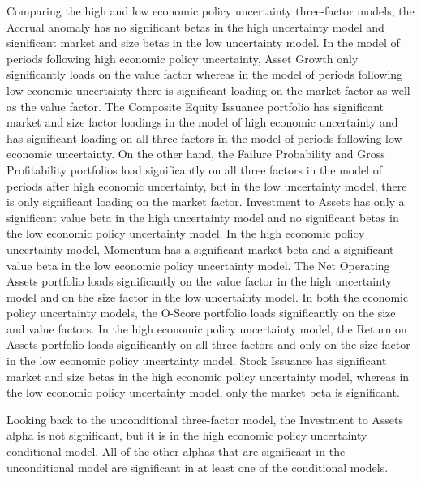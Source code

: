 \documentclass[12pt, a4paper, oneside]{article}
\begin{document}
Comparing the high and low economic policy uncertainty three-factor models, the Accrual anomaly has no significant betas in the high uncertainty model and significant market and size betas in the low uncertainty model. In the model of periods following high economic policy uncertainty, Asset Growth only significantly loads on the value factor whereas in the model of periods following low economic uncertainty there is significant loading on the market factor as well as the value factor. The Composite Equity Issuance portfolio has significant market and size factor loadings in the model of high economic uncertainty and has significant loading on all three factors in the model of periods following low economic uncertainty. On the other hand, the Failure Probability and Gross Profitability portfolios load significantly on all three factors in the model of periods after high economic uncertainty, but in the low uncertainty model, there is only significant loading on the market factor. Investment to Assets has only a significant value beta in the high uncertainty model and no significant betas in the low economic policy uncertainty model. In the high economic policy uncertainty model, Momentum has a significant market beta and a significant value beta in the low economic policy uncertainty model. The Net Operating Assets portfolio loads significantly on the value factor in the high uncertainty model and on the size factor in the low uncertainty model. In both the economic policy uncertainty models, the O-Score portfolio loads significantly on the size and value factors. In the high economic policy uncertainty model, the Return on Assets portfolio loads significantly on all three factors and only on the size factor in the low economic policy uncertainty model. Stock Issuance has significant market and size betas in the high economic policy uncertainty model, whereas in the low economic policy uncertainty model, only the market beta is significant. 

Looking back to the unconditional three-factor model, the Investment to Assets alpha is not significant, but it is in the high economic policy uncertainty conditional model. All of the other alphas that are significant in the unconditional model are significant in at least one of the conditional models.
\end{document}
